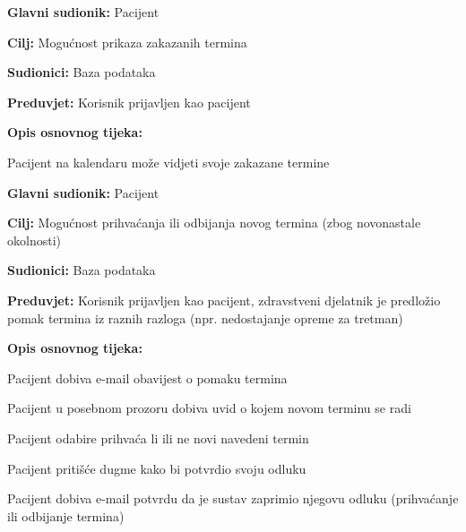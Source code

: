 \noindent {}
\begin{packed_item}
	
	\item \textbf{Glavni sudionik: }Pacijent
	\item  \textbf{Cilj:} Mogućnost prikaza zakazanih termina
	\item  \textbf{Sudionici:} Baza podataka
	\item  \textbf{Preduvjet:} Korisnik prijavljen kao pacijent
	\item  \textbf{Opis osnovnog tijeka:}
	
	\item[] \begin{packed_enum}
		
		\item Pacijent na kalendaru može vidjeti svoje zakazane termine
	\end{packed_enum}
\end{packed_item}

\noindent {}
\begin{packed_item}
	
	\item \textbf{Glavni sudionik: }Pacijent
	\item  \textbf{Cilj:} Mogućnost prihvaćanja ili odbijanja novog termina (zbog novonastale okolnosti)
	\item  \textbf{Sudionici:} Baza podataka
	\item  \textbf{Preduvjet:} Korisnik prijavljen kao pacijent, zdravstveni djelatnik je predložio pomak termina iz raznih razloga (npr. nedostajanje opreme za tretman)
	\item  \textbf{Opis osnovnog tijeka:}
	
	\item[] \begin{packed_enum}
		
		\item Pacijent dobiva e-mail obavijest o pomaku termina
		\item Pacijent u posebnom prozoru dobiva uvid o kojem novom terminu se radi
		\item Pacijent odabire prihvaća li ili ne novi navedeni termin
		\item Pacijent pritišće dugme kako bi potvrdio svoju odluku
		\item Pacijent dobiva e-mail potvrdu da je sustav zaprimio njegovu odluku (prihvaćanje ili odbijanje termina)
	\end{packed_enum}
\end{packed_item}

